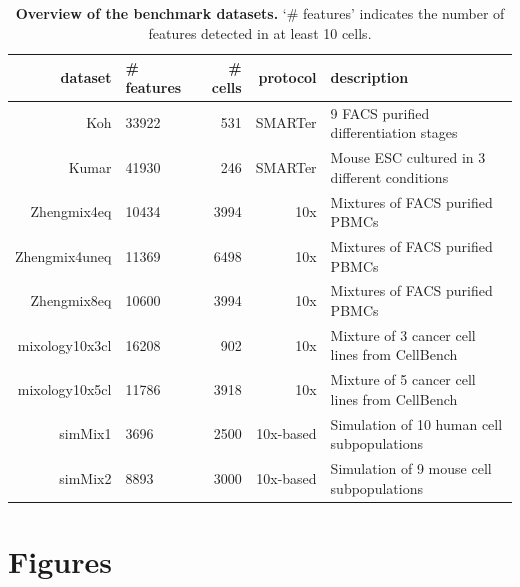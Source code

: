 \documentclass[11pt]{article}
\begin{document}
\begin{backmatter}
\begin{table}[h!]
\caption{\textbf{Overview of the benchmark datasets.} {\color{red}`\# features' indicates the number of features detected in at least 10 cells.}}
\label{tab:table1}
\begin{tabular}{rlrrl}
  \hline
dataset & {\color{red}\# features} & \# cells & protocol & description \\ 
  \hline
Koh & 33922 & 531 & SMARTer & 9 FACS purified differentiation stages \\ 
  Kumar & 41930 & 246 & SMARTer & Mouse ESC cultured in 3 different conditions \\ 
  Zhengmix4eq & 10434 & 3994 & 10x & Mixtures of FACS purified PBMCs \\ 
  Zhengmix4uneq & 11369 & 6498 & 10x & Mixtures of FACS purified PBMCs \\ 
  Zhengmix8eq & 10600 & 3994 & 10x & Mixtures of FACS purified PBMCs \\ 
  mixology10x3cl & 16208 & 902 & 10x & Mixture of 3  cancer cell lines from CellBench \\ 
  mixology10x5cl & 11786 & 3918 & 10x & Mixture of 5 cancer cell lines from CellBench \\ 
  simMix1 & 3696 & 2500 & 10x-based & Simulation of 10 human cell subpopulations \\
  simMix2 & 8893 & 3000 & 10x-based & Simulation of 9 mouse cell subpopulations \\
   \hline
\end{tabular}
\end{table}




\section*{Figures}



\end{backmatter}
\end{document}
